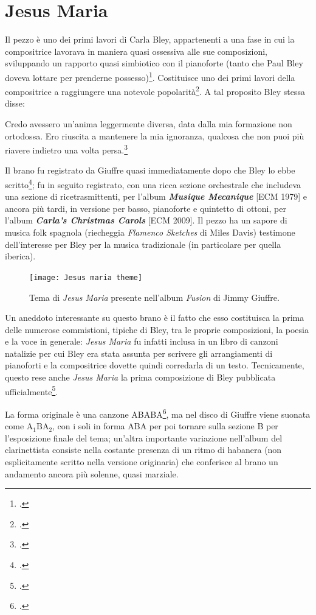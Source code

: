 \section{Jesus Maria} 
Il pezzo è uno dei primi lavori di Carla Bley, appartenenti a una fase in cui la compositrice lavorava in maniera quasi ossessiva alle sue composizioni, sviluppando un rapporto quasi simbiotico con il pianoforte (tanto che Paul Bley doveva lottare per prenderne possesso)\footcite[89]{stopping}. Costituisce uno dei primi lavori della compositrice a raggiungere una notevole popolarità\footcite[26]{carla}. A tal proposito Bley stessa disse:
\begin{fquote}
	Credo avessero un'anima leggermente diversa, data dalla mia formazione non ortodossa. Ero riuscita a mantenere la mia ignoranza, qualcosa che non puoi più riavere indietro una volta persa.\footcite[14]{carla}
\end{fquote}
Il brano fu registrato da Giuffre quasi immediatamente dopo che Bley lo ebbe scritto\footcite[26]{carla}; fu in seguito registrato, con una ricca sezione orchestrale che includeva una sezione di ricetrasmittenti, per l'album \textit{\textbf{Musique Mecanique}} [ECM 1979] e ancora più tardi, in versione per basso, pianoforte e quintetto di ottoni, per l'album \textit{\textbf{Carla's Christmas Carols}} [ECM 2009]. Il pezzo ha un sapore di musica folk spagnola (riecheggia \textit{Flamenco Sketches} di Miles Davis) testimone dell'interesse per Bley per la musica tradizionale (in particolare per quella iberica).\par
\begin{figure}[H]
	\centering
	\texttt{[image: Jesus maria theme]}
	\caption{Tema di \textit{Jesus Maria} presente nell'album \textit{Fusion} di Jimmy Giuffre.}
	\label{jesusmariatheme}
\end{figure}
Un aneddoto interessante su questo brano è il fatto che esso costituisca la prima delle numerose commistioni, tipiche di Bley, tra le proprie composizioni, la poesia e la voce in generale: \textit{Jesus Maria} fu infatti inclusa in un libro di canzoni natalizie per cui Bley era stata assunta per scrivere gli arrangiamenti di pianoforti e la compositrice dovette quindi corredarla di un testo. Tecnicamente, questo rese anche \textit{Jesus Maria} la prima composizione di Bley pubblicata ufficialmente\footcite[33]{carla}.\par
La forma originale è una canzone ABABA\footcite[26]{carla}, ma nel disco di Giuffre viene suonata come $\mathrm{A}_{1}\mathrm{BA}_{2}$, con i soli in forma ABA per poi tornare sulla sezione B per l'esposizione finale del tema; un'altra importante variazione nell'album del clarinettista consiste nella costante presenza di un ritmo di habanera (non esplicitamente scritto nella versione originaria) che conferisce al brano un andamento ancora più solenne, quasi marziale. \par

